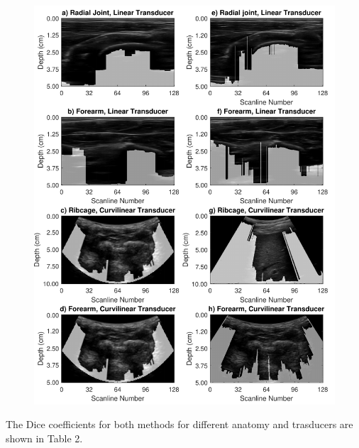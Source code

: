 \documentclass[preprint,5p]{elsarticle}
\begin{document}
\begin{figure}
	\includegraphics[scale=0.55]{fig1.pdf}
\end{figure}

The Dice coefficients for both methods for different anatomy and trasducers are shown in Table 2. 
\end{document}
